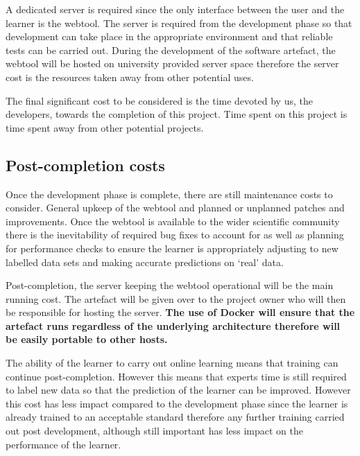 \documentclass{ecmm427_assignment}
\begin{document}
A dedicated server is required since the only interface between the user and the learner is the webtool. The server is required from the development phase so that development can take place in the appropriate environment and that reliable tests can be carried out. During the development of the software artefact, the webtool will be hosted on university provided server space therefore the server cost is the resources taken away from other potential uses.\par

The final significant cost to be considered is the time devoted by us, the developers, towards the completion of this project. Time spent on this project is time spent away from other potential projects.

\subsection{Post-completion costs}
Once the development phase is complete, there are still maintenance costs to consider. General upkeep of the webtool and planned or unplanned patches and improvements. Once the webtool is available to the wider scientific community there is the inevitability of required bug fixes to account for as well as planning for performance checks to ensure the learner is appropriately adjusting to new labelled data sets and making accurate predictions on ‘real’ data.\par

Post-completion, the server keeping the webtool operational will be the main running cost. The artefact will be given over to the project owner who will then be responsible for hosting the server. \textbf{The use of Docker will ensure that the artefact runs regardless of the underlying architecture therefore will be easily portable to other hosts.}\par

The ability of the learner to carry out online learning means that training can continue post-completion. However this means that experts time is still required to label new data so that the prediction of the learner can be improved. However this cost has less impact compared to the development phase since the learner is already trained to an acceptable standard therefore any further training carried out post development, although still important has less impact on the performance of the learner.\par
\end{document}
